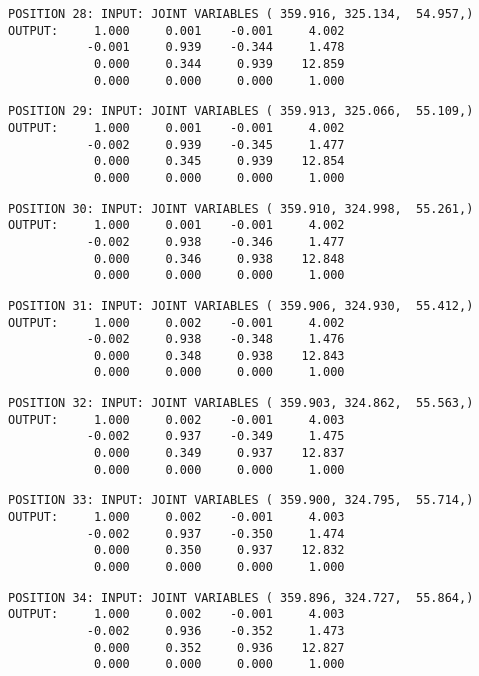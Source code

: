 \begin{verbatim}
POSITION 28: INPUT: JOINT VARIABLES ( 359.916, 325.134,  54.957,)
OUTPUT:     1.000     0.001    -0.001     4.002
           -0.001     0.939    -0.344     1.478
            0.000     0.344     0.939    12.859
            0.000     0.000     0.000     1.000
\end{verbatim} \pagebreak[1]\begin{verbatim}
POSITION 29: INPUT: JOINT VARIABLES ( 359.913, 325.066,  55.109,)
OUTPUT:     1.000     0.001    -0.001     4.002
           -0.002     0.939    -0.345     1.477
            0.000     0.345     0.939    12.854
            0.000     0.000     0.000     1.000
\end{verbatim} \pagebreak[1]\begin{verbatim}
POSITION 30: INPUT: JOINT VARIABLES ( 359.910, 324.998,  55.261,)
OUTPUT:     1.000     0.001    -0.001     4.002
           -0.002     0.938    -0.346     1.477
            0.000     0.346     0.938    12.848
            0.000     0.000     0.000     1.000
\end{verbatim} \pagebreak[1]\begin{verbatim}
POSITION 31: INPUT: JOINT VARIABLES ( 359.906, 324.930,  55.412,)
OUTPUT:     1.000     0.002    -0.001     4.002
           -0.002     0.938    -0.348     1.476
            0.000     0.348     0.938    12.843
            0.000     0.000     0.000     1.000
\end{verbatim} \pagebreak[1]\begin{verbatim}
POSITION 32: INPUT: JOINT VARIABLES ( 359.903, 324.862,  55.563,)
OUTPUT:     1.000     0.002    -0.001     4.003
           -0.002     0.937    -0.349     1.475
            0.000     0.349     0.937    12.837
            0.000     0.000     0.000     1.000
\end{verbatim} \pagebreak[1]\begin{verbatim}
POSITION 33: INPUT: JOINT VARIABLES ( 359.900, 324.795,  55.714,)
OUTPUT:     1.000     0.002    -0.001     4.003
           -0.002     0.937    -0.350     1.474
            0.000     0.350     0.937    12.832
            0.000     0.000     0.000     1.000
\end{verbatim} \pagebreak[1]\begin{verbatim}
POSITION 34: INPUT: JOINT VARIABLES ( 359.896, 324.727,  55.864,)
OUTPUT:     1.000     0.002    -0.001     4.003
           -0.002     0.936    -0.352     1.473
            0.000     0.352     0.936    12.827
            0.000     0.000     0.000     1.000
\end{verbatim} \pagebreak[1]\begin{verbatim}

\end{verbatim}
